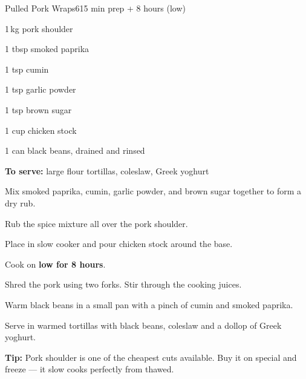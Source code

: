 \begin{recipebox}{Pulled Pork Wraps}{6}{15 min prep + 8 hours (low)}
\begin{ingredients}
  \item 1\,kg pork shoulder
  \item 1 tbsp smoked paprika
  \item 1 tsp cumin
  \item 1 tsp garlic powder
  \item 1 tsp brown sugar
  \item 1 cup chicken stock
  \item 1 can black beans, drained and rinsed
  \item \textbf{To serve:} large flour tortillas, coleslaw, Greek yoghurt
\end{ingredients}

\begin{method}
  \item Mix smoked paprika, cumin, garlic powder, and brown sugar together to form a dry rub.
  \item Rub the spice mixture all over the pork shoulder.
  \item Place in slow cooker and pour chicken stock around the base.
  \item Cook on \textbf{low for 8 hours}.
  \item Shred the pork using two forks. Stir through the cooking juices.
  \item Warm black beans in a small pan with a pinch of cumin and smoked paprika.
  \item Serve in warmed tortillas with black beans, coleslaw and a dollop of Greek yoghurt.
\end{method}

\begin{notelist}
  \item \textbf{Tip:} Pork shoulder is one of the cheapest cuts available. Buy it on special and freeze --- it slow cooks perfectly from thawed.
\end{notelist}
\end{recipebox}
